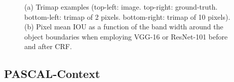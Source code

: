 \begin{figure}[!t]
\centering
{}
  \caption{(a) Trimap examples (top-left: image. top-right: ground-truth. bottom-left: trimap of 2 pixels.
    bottom-right: trimap of 10 pixels). (b) Pixel mean IOU as a function of the band width around the
    object boundaries when employing VGG-16 or ResNet-101 before and after CRF.}
  \label{fig:IOUBoundary}
\end{figure}


\subsection{PASCAL-Context}
\label{exp:pascal_context}

